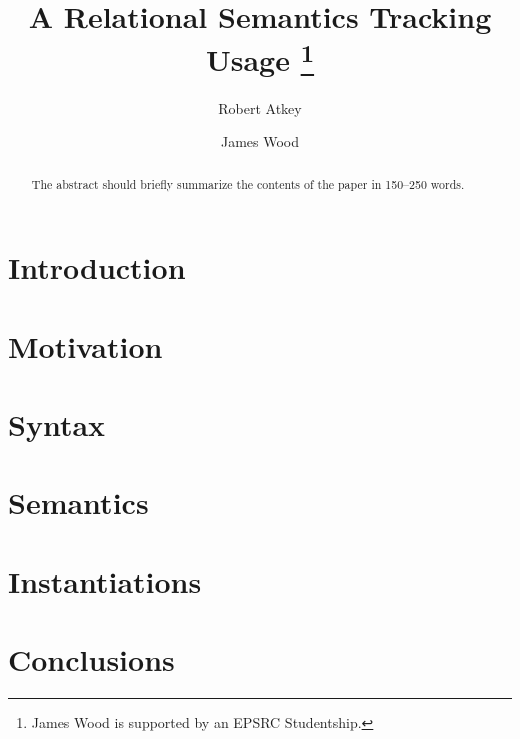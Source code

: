 \documentclass[runningheads]{llncs}
\begin{document}
%
\title{A Relational Semantics Tracking Usage %
  \thanks{James Wood is supported by an EPSRC Studentship.}}
%
%
\author{Robert Atkey \and
  James Wood}
%
%
%
\maketitle              %
%
\begin{abstract}
The abstract should briefly summarize the contents of the paper in
150--250 words.

\end{abstract}

\section{Introduction}
\label{sec:introduction}


\section{Motivation}
\label{sec:motivation}


\section{Syntax}
\label{sec:syntax}


\section{Semantics}
\label{sec:semantics}


\section{Instantiations}
\label{sec:instantiations}


\section{Conclusions}
\label{sec:future-work}

%
%



\end{document}
